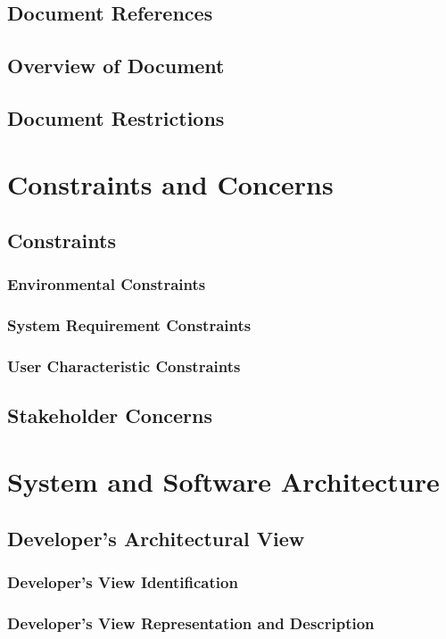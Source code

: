 	\subsection{Document References}
	\subsection{Overview of Document}
	\subsection{Document Restrictions}
\section{Constraints and Concerns}
	\subsection{Constraints}
		\subsubsection{Environmental Constraints}
		\subsubsection{System Requirement Constraints}
		\subsubsection{User Characteristic Constraints}
	\subsection{Stakeholder Concerns}
\section{System and Software Architecture}
	\subsection{Developer's Architectural View}
		\subsubsection{Developer's View Identification}
		\subsubsection{Developer's View Representation and Description}
